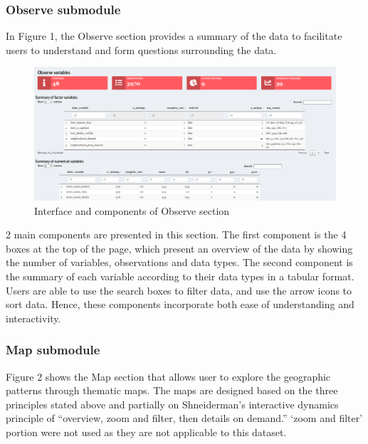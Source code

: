 \documentclass{acm_proc_article-sp}
\begin{document}
\hypertarget{observe-submodule}{%
\subsubsection{Observe submodule}\label{observe-submodule}}

In Figure 1, the Observe section provides a summary of the data to
facilitate users to understand and form questions surrounding the data.

\begin{figure}[H]

{\centering \includegraphics[width=1\linewidth]{images/design_observe} 

}

\caption{Interface and components of Observe section}\label{fig:unnamed-chunk-1}
\end{figure}

2 main components are presented in this section. The first component is
the 4 boxes at the top of the page, which present an overview of the
data by showing the number of variables, observations and data types.
The second component is the summary of each variable according to their
data types in a tabular format. Users are able to use the search boxes
to filter data, and use the arrow icons to sort data. Hence, these
components incorporate both ease of understanding and interactivity.

\hypertarget{map-submodule}{%
\subsubsection{Map submodule}\label{map-submodule}}

Figure 2 shows the Map section that allows user to explore the
geographic patterns through thematic maps. The maps are designed based
on the three principles stated above and partially on Shneiderman's
interactive dynamics principle of ``overview, zoom and filter, then
details on demand.'' `zoom and filter' portion were not used as they are
not applicable to this dataset.
\end{document}
